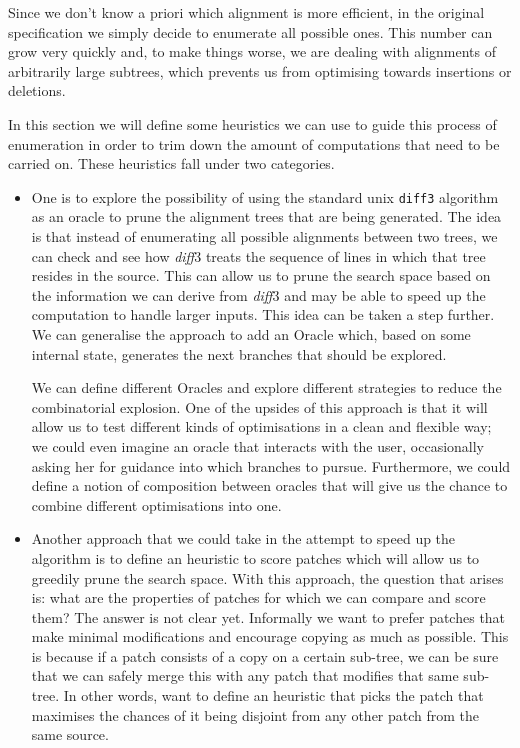 \documentclass[11pt, titlepage]{article}
\newcommand{\diff}{\emph{diff}}
\begin{document}
Since we don't know a priori which alignment is more efficient, in the original specification we simply decide to enumerate all possible ones. This number can grow very quickly and, to make things worse, we are dealing with alignments of arbitrarily large subtrees, which prevents
us from optimising towards insertions or deletions.

In this section we will define some heuristics we can use to guide this process of enumeration in order to trim down the amount of computations that need to be carried on.
These heuristics fall under two categories.

\begin{itemize}
\item One is to explore the possibility of using the standard unix \texttt{diff3} algorithm as an oracle to prune the alignment trees that are being generated. 
The idea is that instead of enumerating all possible alignments between two trees, we can check and see how \diff3 treats the sequence of lines in which that tree resides in the source. This can allow us to prune the search space based on the information we can derive from \diff3 and may be able to speed up the computation to handle larger inputs. This idea can be taken a step further. We can generalise the approach to add an Oracle which, based on some internal state, generates the next branches that should be explored.

We can define different Oracles and explore different strategies to reduce the combinatorial explosion. 
One of the upsides of this approach is that it will allow us to test different kinds of optimisations in a clean and flexible way; we could even imagine an oracle that interacts with the user, occasionally asking her for guidance into which branches to pursue. 
Furthermore, we could define a notion of composition between oracles that will give us the chance to combine different optimisations into one.


\item Another approach that we could take in the attempt to speed up the algorithm is to define an heuristic to score patches which will allow us to greedily prune the search space. 
With this approach, the question that arises is: what are the properties of patches for which we can compare and score them? The answer is not clear yet. Informally we want to prefer patches that make minimal modifications and encourage copying as much as possible. This is because 
if a patch consists of a copy on a certain sub-tree, we can be sure that we can 
safely merge this with any patch that modifies that same sub-tree. 
In other words, want to define an heuristic that picks the patch that maximises the chances of it being disjoint from any other patch from the same source.
\end{itemize}
\end{document}
